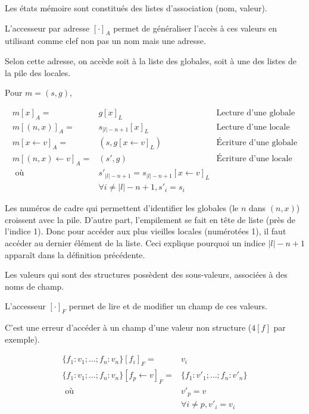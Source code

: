 \begin{definition}

  Les états mémoire sont constitués des listes d'association (nom, valeur).

  L'accesseur par adresse $[\cdot]_A$ permet de généraliser l'accès à ces
  valeurs en utilisant comme clef non pas un nom mais une adresse.

  Selon cette adresse, on accède soit à la liste des globales, soit à une des
  listes de la pile des locales.

  Pour $m = (s, g)$,

  \begin{align*}
    m [x]_A          = & g[x]_L           & \textrm{Lecture d'une globale} \\
    m [(n, x)]_A     = & s_{|l|-n+1}[x]_L & \textrm{Lecture d'une locale} \\
    m [x ← v]_A      = & (s, g[x←v]_L)    & \textrm{Écriture d'une globale} \\
    m [(n, x) ← v]_A = & (s', g)          & \textrm{Écriture d'une locale} \\
           \mbox{ où } & s'_{|l|-n+1} = s_{|l|-n+1}[x ← v]_L \\
                       & ∀ i ≠ |l|-n+1, s'_i = s_i
  \end{align*}

\end{definition}

Les numéros de cadre qui permettent d'identifier les globales (le $n$ dans $(n,
x)$) croissent avec la pile. D'autre part, l'empilement se fait en tête de liste
(près de l'indice 1). Donc pour accéder aux plus vieilles locales (numérotées
1), il faut accéder au dernier élément de la liste. Ceci explique pourquoi un
indice $|l|-n+1$ apparaît dans la définition précédente.

\begin{definition}

  Les valeurs qui sont des structures possèdent des sous-valeurs, associées à
  des noms de champ.

  L'accesseur $[ \cdot ]_F$ permet de lire et de modifier un champ de ces
  valeurs.

  C'est une erreur d'accéder à un champ d'une valeur non structure ($4[f]$ par
  exemple).

  \begin{align*}
    \{ f_1 : v_1; … ; f_n : v_n \}[f_i]_F = & v_i \\
    \{ f_1 : v_1; … ; f_n : v_n \}[f_p ← v]_F = & \{ f_1 : v'_1; … ; f_n : v'_n \} \\
          \mbox{ où } & v'_p = v \\
                      & ∀ i ≠ p, v'_i = v_i
  \end{align*}

\end{definition}

